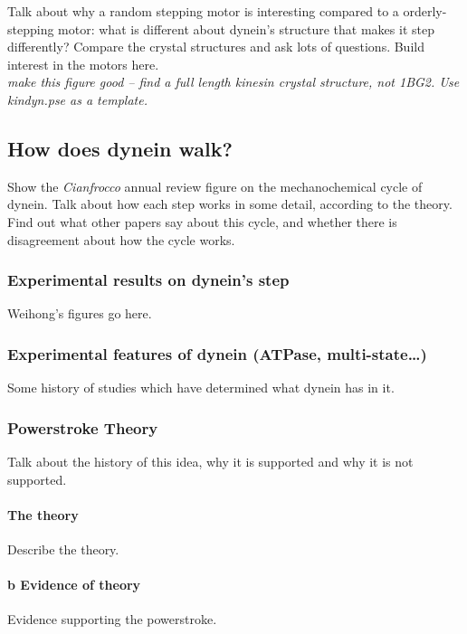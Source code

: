 \documentclass[10pt]{article} %
\begin{document}
Talk about why a random stepping motor is interesting compared to a orderly-stepping motor: what
is different about dynein's structure that makes it step differently? Compare the crystal structures
and ask lots of questions. Build interest in the motors here.\\


\textit{make this figure good -- find a full length kinesin crystal structure, not 1BG2. Use kindyn.pse as a template.}

\subsection{How does dynein walk?}
Show the \textit{Cianfrocco} annual review figure on the mechanochemical cycle of dynein. Talk about
how each step works in some detail, according to the theory. Find out what other papers say about
this cycle, and whether there is disagreement about how the cycle works.


\subsubsection{Experimental results on dynein’s step}
Weihong's figures go here.\\
\subsubsection{Experimental features of dynein (ATPase, multi-state…)}
Some history of studies which have determined what dynein has in it.\\

\subsubsection{Powerstroke Theory}
Talk about the history of this idea, why it is supported and why it is not supported.\\
\paragraph{The theory}
Describe the theory.
\paragraph{b Evidence of theory}
Evidence supporting the powerstroke.
\end{document}
